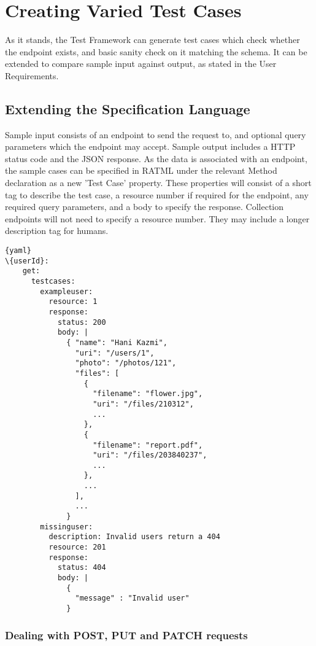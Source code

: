 \chapter{Creating Varied Test Cases}

As it stands, the Test Framework can generate test cases which check whether the endpoint exists, and basic sanity check on it matching the schema. It can be extended to compare sample input against output, as stated in the User Requirements.

\section{Extending the Specification Language}

Sample input consists of an endpoint to send the request to, and optional query parameters which the endpoint may accept. Sample output includes a HTTP status code and the JSON response. As the data is associated with an endpoint, the sample cases can be specified in RATML under the relevant  Method declaration as a new 'Test Case' property. These properties will consist of a short tag to describe the test case, a resource number if required for the endpoint, any required query parameters, and a body to specify the response. Collection endpoints will not need to specify a resource number. They may include a longer description tag for humans.

\begin{lstlisting}[frame=lines]{yaml}
\{userId}:
    get:
      testcases:
        exampleuser:
          resource: 1
          response: 
            status: 200
            body: |
              { "name": "Hani Kazmi",
                "uri": "/users/1",
                "photo": "/photos/121",
                "files": [
                  {
                  	"filename": "flower.jpg",
                  	"uri": "/files/210312",
                  	...
                  },
                  {
                  	"filename": "report.pdf",
                  	"uri": "/files/203840237",
                  	...
                  },
                  ...
                ],
                ...
              }
        missinguser:
          description: Invalid users return a 404
          resource: 201
          response: 
            status: 404
            body: |
              {
              	"message" : "Invalid user"
              }
\end{lstlisting}

\subsection{Dealing with POST, PUT and PATCH requests}

